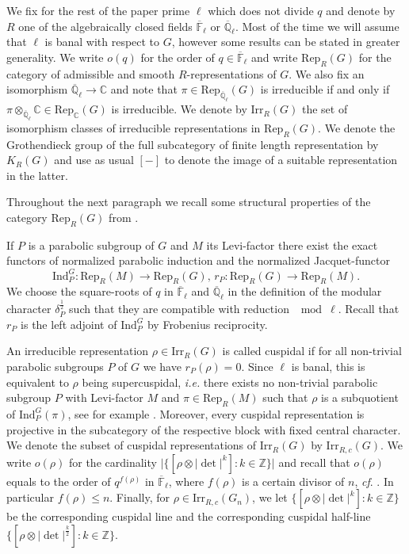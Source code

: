 \documentclass[10pt,a4paper]{article}
\theoremstyle{remark}
\theoremstyle{definition}
\newcommand{\fl}{{\overline{\mathbb{F}}_\ell}}
\newcommand{\ql}{{\overline{\mathbb{Q}}_\ell}}
\newcommand{\rep}{\mathrm{Rep}}
\newcommand{\ip}{\mathrm{Ind}_P^G}
\newcommand{\ra}{\rightarrow}
\newcommand{\irr}{\mathrm{Irr}}
\newcommand{\ZZ}{\mathbb{Z}}
\newcommand{\CC}{\mathbb{C}}
\begin{document}
We fix for the rest of the paper prime $\ell$ which does not divide $q$ and denote by $R$ one of the algebraically closed fields $\fl$ or $\ql$. Most of the time we will assume that $\ell$ is banal with respect to $G$, however some results can be stated in greater generality. We write $o(q)$ for the order of $q\in\fl$ and write $\rep_R(G)$ for the category of admissible and smooth $R$-representations of $G$. We also fix an isomorphism $\ql\ra \CC$ and note that $\pi\in\rep_\ql(G)$ is irreducible if and only if $\pi\otimes_\ql\CC\in\rep_\CC(G)$ is irreducible. We denote by $\irr_R(G)$ the set of isomorphism classes of irreducible representations in $\rep_R(G)$.
We denote the Grothendieck group of the full subcategory of finite length representation by $K_R(G)$ and use as usual $[-]$ to denote the image of a suitable representation in the latter.

Throughout the next paragraph we recall some structural properties of the category $\rep_R(G)$ from \cite{Vig96}.

If $P$ is a parabolic subgroup of $G$ and $M$ its Levi-factor there exist the exact functors of normalized parabolic induction and the normalized Jacquet-functor
\[\ip\colon \rep_R(M)\ra\rep_R(G),\, r_P\colon\rep_R(G)\ra\rep_R(M).\] We choose the square-roots of $q$ in $\fl$ and $\ql$ in the definition of the modular character $\delta_P^{\frac{1}{2}}$ such that they are compatible with reduction $\mod\ell$. Recall that $r_P$ is the left adjoint of $\ip$ by Frobenius reciprocity.

An irreducible representation $\rho\in\irr_R(G)$ is called cuspidal if for all non-trivial parabolic subgroups $P$ of $G$ we have $r_P(\rho)=0$. Since $\ell$ is banal, this is equivalent to $\rho$ being supercuspidal, \emph{i.e.} there exists no non-trivial parabolic subgroup $P$ with Levi-factor $M$ and $\pi\in \rep_R(M)$ such that $\rho$ is a subquotient of $\ip(\pi)$, see for example \cite[Theorem p373]{Vig96}. Moreover, every cuspidal representation is projective in the subcategory of the respective block with fixed central character.
We denote the subset of cuspidal representations of $\irr_R(G)$ by $\irr_{R,c}(G)$.
We write $o(\rho)$ for the cardinality $\lvert\{[\rho\otimes\lvert\det\lvert^k]:k\in\ZZ\}\rvert$ and recall that $o(\rho)$ equals to the order of $q^{f(\rho)}$ in $\fl$, where $f(\rho)$ is a certain divisor of $n$, \emph{cf}. \cite[III]{Vig96}. In particular $f(\rho)\le n$.
Finally, for $\rho\in\irr_{R,c}(G_n)$, we let $\{[\rho\otimes\lvert\det\rvert^k]:k\in\ZZ\}$ be the corresponding cuspidal line and the corresponding cuspidal half-line $\{[\rho\otimes\lvert\det\rvert^\frac{k}{2}]:k\in\ZZ\}$.
\end{document}

